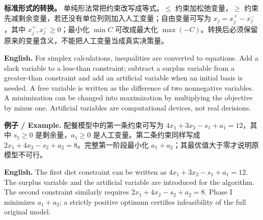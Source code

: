 \documentclass[UTF8,11pt,a4paper]{ctexart}
\newcommand{\EN}[1]{\par\noindent \textbf{English.} #1\par}
\newcommand{\EX}[2]{\par\noindent \textbf{例子 / Example.} #1\par\EN{#2}}
\begin{document}
\noindent \textbf{标准形式的转换。} 单纯形法常把约束改写成等式。$\le$ 约束加松弛变量，$\ge$ 约束先减剩余变量，若还没有单位列则加入人工变量；自由变量可写为 $x_j=x_j^+-x_j^-$，其中 $x_j^+,x_j^-\ge0$；最小化 $\min C$ 可改成最大化 $\max(-C)$。转换后必须保留原来的变量含义，不能把人工变量当成真实决策量。
\EN{For simplex calculations, inequalities are converted to equations. Add a slack variable to a less-than constraint; subtract a surplus variable from a greater-than constraint and add an artificial variable when an initial basis is needed. A free variable is written as the difference of two nonnegative variables. A minimization can be changed into maximization by multiplying the objective by minus one. Artificial variables are computational devices, not real decisions.}

\EX{配餐模型中的第一条约束可写为 $4x_1+3x_2-s_1+a_1=12$，其中 $s_1\ge0$ 是剩余量，$a_1\ge0$ 是人工变量。第二条约束同样写成 $2x_1+4x_2-s_2+a_2=8$。完整第一阶段最小化 $a_1+a_2$；其最优值大于零才说明原模型不可行。}{The first diet constraint can be written as $4x_1+3x_2-s_1+a_1=12$. The surplus variable and the artificial variable are introduced for the algorithm. The second constraint similarly requires $2x_1+4x_2-s_2+a_2=8$. Phase I minimizes $a_1+a_2$; a strictly positive optimum certifies infeasibility of the full original model.}
\end{document}
